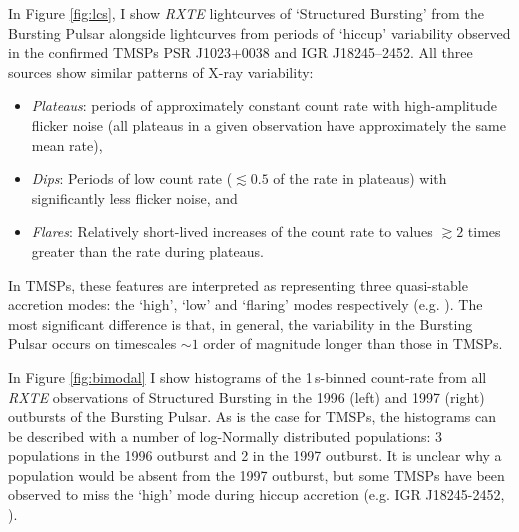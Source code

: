 \par In Figure \ref{fig:lcs}, I show \textit{RXTE} lightcurves of `Structured Bursting' from the Bursting Pulsar alongside lightcurves from periods of `hiccup' variability observed in the confirmed TMSPs PSR J1023+0038 and IGR J18245--2452. All three sources show similar patterns of X-ray variability:
\begin{itemize}
\item \textit{Plateaus}: periods of approximately constant count rate with high-amplitude flicker noise (all plateaus in a given observation have approximately the same mean rate),
\item \textit{Dips}: Periods of low count rate ($\lesssim0.5$ of the rate in plateaus) with significantly less flicker noise, and 
\item \textit{Flares}: Relatively short-lived increases of the count rate to values $\gtrsim2$ times greater than the rate during plateaus.
\end{itemize}
In TMSPs, these features are interpreted as representing three quasi-stable accretion modes: the `high', `low' and `flaring' modes respectively (e.g. \citealp{Bogdanov_TMSPVar}). The most significant difference is that, in general, the variability in the Bursting Pulsar occurs on timescales $\sim1$ order of magnitude longer than those in TMSPs.
\par In Figure \ref{fig:bimodal} I show histograms of the 1\,s-binned count-rate from all \textit{RXTE} observations of Structured Bursting in the 1996 (left) and 1997 (right) outbursts of the Bursting Pulsar. As is the case for TMSPs, the histograms can be described with a number of log-Normally distributed populations: 3 populations in the 1996 outburst and 2 in the 1997 outburst. It is unclear why a population would be absent from the 1997 outburst, but some TMSPs have been observed to miss the `high' mode during hiccup accretion (e.g. IGR J18245-2452, \citealp{Ferrigno_TMSPVar}).

